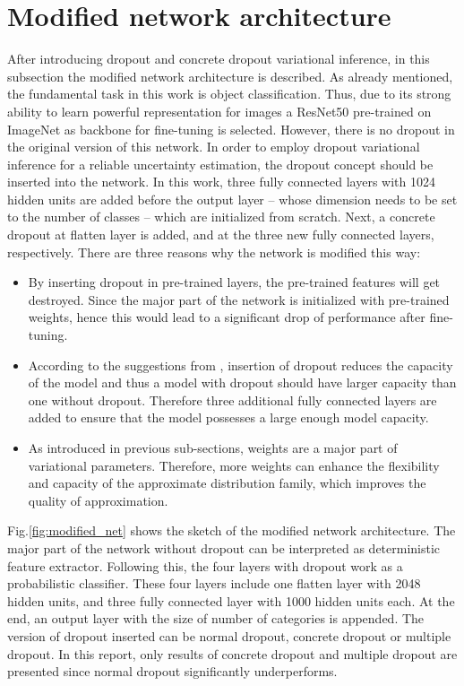 


\section{Modified network architecture}
After introducing dropout and concrete dropout variational inference, in this subsection the modified network architecture is described.
As already mentioned, the fundamental task in this work is object classification.
Thus, due to its strong ability to learn powerful representation for images a ResNet50\cite{he2016deep} pre-trained on ImageNet as backbone for fine-tuning is selected. 
However, there is no dropout in the original version of this network.
In order to employ dropout variational inference for a reliable uncertainty estimation, the dropout concept should be inserted into the network.
In this work, three fully connected layers with 1024 hidden units are added before the output layer -- whose dimension needs to be set to the number of classes -- which are initialized from scratch. 
Next, a concrete dropout at flatten layer is added, and at the three new fully connected layers, respectively.
There are three reasons why the network is modified this way:
\begin{itemize}
	\item By inserting dropout in pre-trained layers, the pre-trained features will get destroyed. Since the major part of the network is initialized with pre-trained weights, hence this would lead to a significant drop of performance after fine-tuning.
	\item According to the suggestions from \cite{srivastava2014dropout}, insertion of dropout reduces the capacity of the model and thus a model with dropout should have larger capacity than one without dropout. Therefore three additional fully connected layers are added to ensure that the model possesses a large enough model capacity.
	\item As introduced in previous sub-sections, weights are a major part of variational parameters. Therefore, more weights can enhance the flexibility and capacity of the approximate distribution family, which improves the quality of approximation.  
\end{itemize}

Fig.\ref{fig:modified_net} shows the sketch of the modified network architecture.
The major part of the network without dropout can be interpreted as deterministic feature extractor.
Following this, the four layers with dropout work as a probabilistic classifier.
These four layers include one flatten layer with 2048 hidden units, and three fully connected layer with 1000 hidden units each.
At the end, an output layer with the size of number of categories is appended.
The version of dropout inserted can be normal dropout, concrete dropout or multiple dropout.
In this report, only results of concrete dropout and multiple dropout are presented since normal dropout significantly underperforms.


